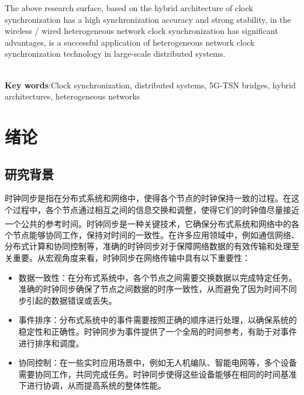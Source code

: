 \documentclass[UTF8,a4paper,12pt]{ctexart}
\numberwithin{equation}{section}
\begin{document}
The above research surface, based on the hybrid architecture of clock synchronization has a high synchronization accuracy and strong stability, in the wireless / wired heterogeneous network clock synchronization has significant advantages, is a successful application of heterogeneous network clock synchronization technology in large-scale distributed systems.

\hspace{8mm} \par 
~\\ 
\textbf{Key words}:Clock synchronization, distributed systems, 5G-TSN bridges, hybrid architectures, heterogeneous networks 

\newpage
\renewcommand\contentsname{\textbf{目\quad录}}
\begin{center}
{\tableofcontents
\thispagestyle{fancy}
}
\end{center}

\newpage
{}
\section{绪论}
\subsection{研究背景}
时钟同步是指在分布式系统和网络中，使得各个节点的时钟保持一致的过程。在这个过程中，各个节点通过相互之间的信息交换和调整，使得它们的时钟值尽量接近一个公共的参考时间\textsuperscript{\cite{kopetz1987clock}}。时钟同步是一种关键技术，它确保分布式系统和网络中的各个节点能够协同工作，保持对时间的一致性。在许多应用领域中，例如通信网络、分布式计算和协同控制等，准确的时钟同步对于保障网络数据的有效传输和处理至关重要。从宏观角度来看，时钟同步在网络传输中具有以下重要性：
\begin{itemize}
	\item 数据一致性：在分布式系统中，各个节点之间需要交换数据以完成特定任务。准确的时钟同步确保了节点之间数据的时序一致性，从而避免了因为时间不同步引起的数据错误或丢失。
	\item 事件排序：分布式系统中的事件需要按照正确的顺序进行处理，以确保系统的稳定性和正确性。时钟同步为事件提供了一个全局的时间参考，有助于对事件进行排序和调度。
	\item 协同控制：在一些实时应用场景中，例如无人机编队、智能电网等，多个设备需要协同工作，共同完成任务。时钟同步使得这些设备能够在相同的时间基准下进行协调，从而提高系统的整体性能。
\end{itemize}
\end{document}
